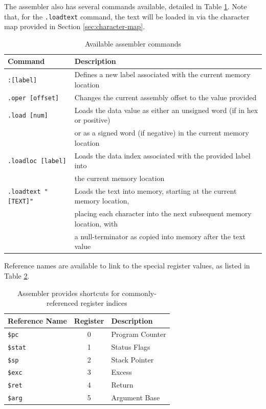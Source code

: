 \documentclass{article}
\begin{document}
\pagebreak

The assembler also has several commands available, detailed in Table \ref{table:assembler-commands}. Note that, for the \texttt{.loadtext} command, the text will be loaded in via the character map provided in Section \ref{sec:character-map}.

\begin{table}[h!]
    \centering
    \begin{tabular}{l|l}
        \hline
        Command & Description \\
        \hline
        \texttt{:[label]} & Defines a new label associated with the current memory location \\
        \texttt{.oper [offset]} & Changes the current assembly offset to the value provided \\
        \texttt{.load [num]} & Loads the data value as either an unsigned word (if in hex or positive)\\
        & or as a signed word (if negative) in the current memory location \\
        \texttt{.loadloc [label]} & Loads the data index associated with the provided label into \\
        & the current memory location \\
        \texttt{.loadtext "[TEXT]"} & Loads the text into memory, starting at the current memory location, \\
        & placing each character into the next subsequent memory location, with \\
        & a null-terminator as copied into memory after the text value \\
        \hline
    \end{tabular}
    \caption{Available assembler commands}
    \label{table:assembler-commands}
\end{table}

Reference names are available to link to the special register values, as listed in Table \ref{table:assembler-register-references}.

\begin{table}[h!]
    \centering
    \begin{tabular}{l|cl}
        \hline
        Reference Name & Register & Description \\
        \hline
        \texttt{\$pc} & 0 & Program Counter \\
        \texttt{\$stat} & 1 & Status Flags \\
        \texttt{\$sp} & 2 & Stack Pointer \\
        \texttt{\$exc} & 3 & Excess \\
        \texttt{\$ret} & 4 & Return \\
        \texttt{\$arg} & 5 & Argument Base \\
        \hline
    \end{tabular}
    \caption{Assembler provides shortcuts for commonly-referenced register indices}
    \label{table:assembler-register-references}
\end{table}
\end{document}
